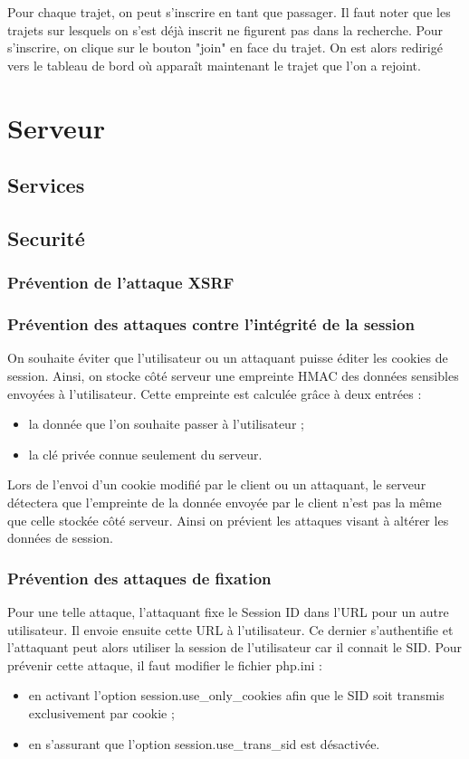 \documentclass[a4paper]{article}
\begin{document}
Pour chaque trajet, on peut s'inscrire en tant que passager. Il faut noter que les trajets sur lesquels on s'est déjà inscrit ne figurent
pas dans la recherche. Pour s'inscrire, on clique sur le bouton "join" en face du trajet. On est alors redirigé vers le tableau de bord
où apparaît maintenant le trajet que l'on a rejoint.

\section{Serveur}

	\subsection{Services}
	\subsection{Securité}
 		\subsubsection{Prévention de l'attaque XSRF}
 		
 		\subsubsection{Prévention des attaques contre l'intégrité de la session}
 		
On souhaite éviter que l'utilisateur ou un attaquant puisse éditer les cookies de session.
Ainsi, on stocke côté serveur une empreinte HMAC des données sensibles envoyées à l'utilisateur.
Cette empreinte est calculée grâce à deux entrées :
\begin{itemize}
	\item la donnée que l'on souhaite passer à l'utilisateur ;
	\item la clé privée connue seulement du serveur.
\end{itemize}
Lors de l'envoi d'un cookie modifié par le client ou un attaquant, le serveur détectera que l'empreinte
de la donnée envoyée par le client n'est pas la même que celle stockée côté serveur.
Ainsi on prévient les attaques visant à altérer les données de session.

		\subsubsection{Prévention des attaques de fixation}
		
Pour une telle attaque, l'attaquant fixe le Session ID dans l'URL pour un autre utilisateur.
Il envoie ensuite cette URL à l'utilisateur. Ce dernier s'authentifie et l'attaquant peut alors
utiliser la session de l'utilisateur car il connait le SID.
Pour prévenir cette attaque, il faut modifier le fichier php.ini :
\begin{itemize}
	\item en activant l'option session.use\_only\_cookies afin que le SID soit transmis exclusivement par cookie ;
	\item en s'assurant que l'option session.use\_trans\_sid est désactivée.
\end{itemize}
	
\end{document}

